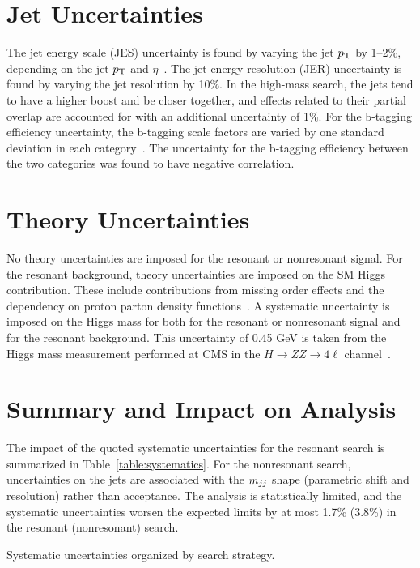 \section{Jet Uncertainties\label{sec:jetunc}}

The jet energy scale (JES) uncertainty is found by varying the jet $p_{\rm T}$ by 1--2\%,
depending on the jet $p_{\rm T}$ and $\eta$~\cite{JINST6}.
The jet energy resolution (JER) uncertainty is found by varying the jet resolution by 10\%.
In the high-mass search, the jets tend to have a higher boost and be closer together,
and effects related to their partial overlap are accounted for with an additional uncertainty of 1\%.
For the b-tagging efficiency uncertainty, the b-tagging scale factors are varied by one standard
deviation in each category~\cite{BTV}. 
The uncertainty for the b-tagging efficiency between the two categories
was found to have negative correlation.

\section{Theory Uncertainties\label{sec:theoryunc}}

No theory uncertainties are imposed for the resonant or nonresonant signal.
For the resonant background, theory uncertainties are imposed on the SM Higgs contribution. These
include contributions from missing order effects and the dependency on proton parton density
functions~\cite{Dittmaier:2011ti,LHC:SMHiggsBR}.
A systematic uncertainty is imposed on the Higgs mass for both for the resonant or nonresonant signal
and for the resonant background.
This uncertainty of 0.45 GeV is taken from the Higgs mass measurement performed at CMS in the
$H\rightarrow ZZ \rightarrow 4\ell$ channel~\cite{Chatrchyan:2013mxa}.

\section{Summary and Impact on Analysis\label{sec:uncimpact}}

The impact of the quoted systematic uncertainties for the resonant search is summarized in
Table~\ref{table:systematics}. For the nonresonant search, uncertainties on the jets are
associated with the $m_{jj}$ shape (parametric shift and resolution) rather than acceptance.
The analysis is statistically limited, and the systematic uncertainties worsen the expected limits
by at most 1.7\% (3.8\%) in the resonant (nonresonant) search.

\begin{table}[ht]
  \centering
  \renewcommand{\arraystretch}{1.4}
  \caption{Systematic uncertainties organized by search strategy.}
  
  \label{table:systematics}
\end{table}
